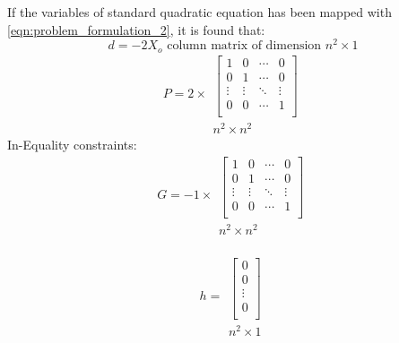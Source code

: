 If the variables of standard quadratic equation has been mapped with \ref{eqn:problem_formulation_2}, it is found that:
\begin{equation}
d=-2X_o \textrm{ column matrix of dimension }n^2\times 1
\end{equation}
\[P= 2\times
\begin{array}{c}
    \begin{bmatrix}
        1 & 0 & \cdots & 0\\
        0 & 1 & \cdots & 0\\
        \vdots & \vdots & \ddots & \vdots\\
        0 & 0 & \cdots & 1\\
    \end{bmatrix}\\
    n^2\times n^2
\end{array}
\]
In-Equality constraints:\\
\[G= -1 \times
\begin{array}{c}
    \begin{bmatrix}
        1 & 0 & \cdots & 0\\
        0 & 1 & \cdots & 0\\
        \vdots & \vdots & \ddots & \vdots\\
        0 & 0 & \cdots & 1\\
    \end{bmatrix}\\
    n^2\times n^2
\end{array}
\]
\\
\[h=
\begin{array}{c}
    \begin{bmatrix}
        0 \\
        0 \\
        \vdots\\
        0 \\
    \end{bmatrix}\\
    n^2\times 1
\end{array}
\]

